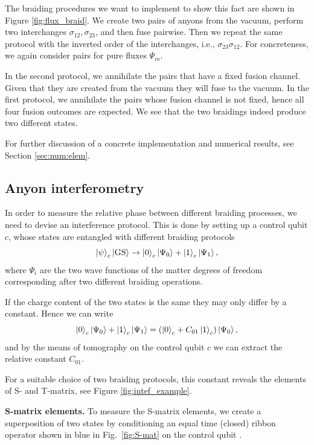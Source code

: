 \documentclass[two column]{article}
\begin{document}
The braiding procedures we want to implement to show this fact are shown in Figure \ref{fig:flux_braid}. We create two pairs of anyons from the vacuum, perform two interchanges $\sigma_{12}, \sigma_{23}$, and then fuse pairwise. Then we repeat the same protocol with the inverted order of the interchanges, i.e., $\sigma_{23} \sigma_{12}$. For concreteness, we again consider pairs for pure fluxes $\Psi_m$. 



In the second protocol, we annihilate the pairs that have a fixed fusion channel. Given that they are created from the vacuum they will fuse to the vacuum.
In the first protocol, we annihilate the pairs whose fusion channel is not fixed, hence all four fusion outcomes are expected. We see that the two braidings indeed produce two different states. 

For further discussion of a concrete implementation and numerical results, see Section \ref{sec:num:elem}.

\subsection{Anyon interferometry}\label{subsec:Intef}




In order to measure the relative phase between different braiding processes, we need to devise an interference protocol. This is done by setting up a control qubit $c$, whose states are entangled with different braiding protocols
\begin{equation}
    \ket{\psi}_c\ket{\text{GS}} \rightarrow \ket{0}_c \ket{\Psi_0} + \ket{1}_c \ket{\Psi_1},
\end{equation}
where $\Psi_i$ are the two wave functions of the matter degrees of freedom corresponding after two different braiding operations.

If the charge content of the two states is the same they may only differ by a constant. Hence we can write
\begin{equation}
    \ket{0}_c \ket{\Psi_0} + \ket{1}_c \ket{\Psi_1} = (\ket{0}_c + C_{01}\ket{1}_c)\ket{\Psi_0},
\end{equation}
and by the means of tomography on the control qubit $c$ we can extract the relative constant $C_{01}$.

For a suitable choice of two braiding protocols, this constant reveals the elements of S- and T-matrix, see Figure \ref{fig:intef_example}.

\textbf{S-matrix elements.}
To measure the S-matrix elements, we create a superposition of two states by conditioning an equal time (closed) ribbon operator shown in blue in Fig.~\ref{fig:S-mat} on the control qubit . 
\end{document}
